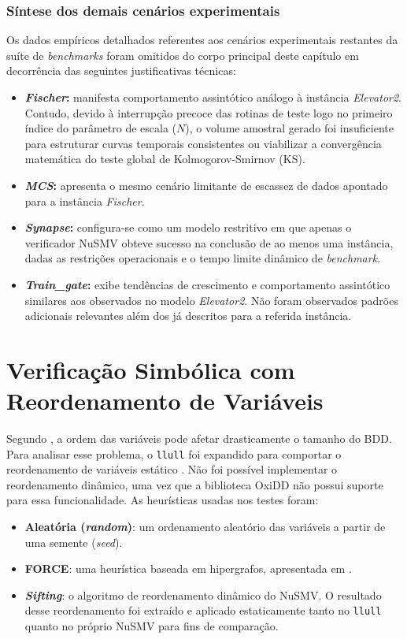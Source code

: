 \documentclass[cic,tc]{infufrgs}
\begin{document}
	\subsection{Síntese dos demais cenários experimentais}
	\label{sec:sintese_experimentos}
	
	Os dados empíricos detalhados referentes aos cenários experimentais restantes da suíte de \textit{benchmarks} foram omitidos do corpo principal deste capítulo em decorrência das seguintes justificativas técnicas:
	
	\begin{itemize}
		\item \textbf{\textit{Fischer}:} manifesta comportamento assintótico análogo à instância \textit{Elevator2}. Contudo, devido à interrupção precoce das rotinas de teste logo no primeiro índice do parâmetro de escala ($N$), o volume amostral gerado foi insuficiente para estruturar curvas temporais consistentes ou viabilizar a convergência matemática do teste global de Kolmogorov-Smirnov (KS).
		\item \textbf{\textit{MCS}:} apresenta o mesmo cenário limitante de escassez de dados apontado para a instância \textit{Fischer}.
		\item \textbf{\textit{Synapse}:} configura-se como um modelo restritivo em que apenas o verificador NuSMV obteve sucesso na conclusão de ao menos uma instância, dadas as restrições operacionais e o tempo limite dinâmico de \textit{benchmark}.
		\item \textbf{\textit{Train\_gate}:} exibe tendências de crescimento e comportamento assintótico similares aos observados no modelo \textit{Elevator2}. Não foram observados padrões adicionais relevantes além dos já descritos para a referida instância.
	\end{itemize}
	
	
	\chapter{Verificação Simbólica com Reordenamento de Variáveis}
	\label{ch:ver_reordenamento}
	
	Segundo , a ordem das variáveis pode afetar drasticamente o tamanho do BDD. 
	Para analisar esse problema, o \texttt{llull} foi expandido para comportar o reordenamento de variáveis estático \cite{llull}. 
	Não foi possível implementar o reordenamento dinâmico, uma vez que a biblioteca OxiDD não possui suporte para essa funcionalidade.
	As heurísticas usadas nos testes foram:
	\begin{itemize}
		\item \textbf{Aleatória (\textit{random})}: um ordenamento aleatório das variáveis a partir de uma semente (\textit{seed}).
		\item \textbf{FORCE}: uma heurística baseada em hipergrafos, apresentada em .
		\item \textbf{\textit{Sifting}}: o algoritmo de reordenamento dinâmico do NuSMV. O resultado desse reordenamento foi extraído e aplicado estaticamente tanto no \texttt{llull} quanto no próprio NuSMV para fins de comparação.
	\end{itemize}
	
\end{document}
